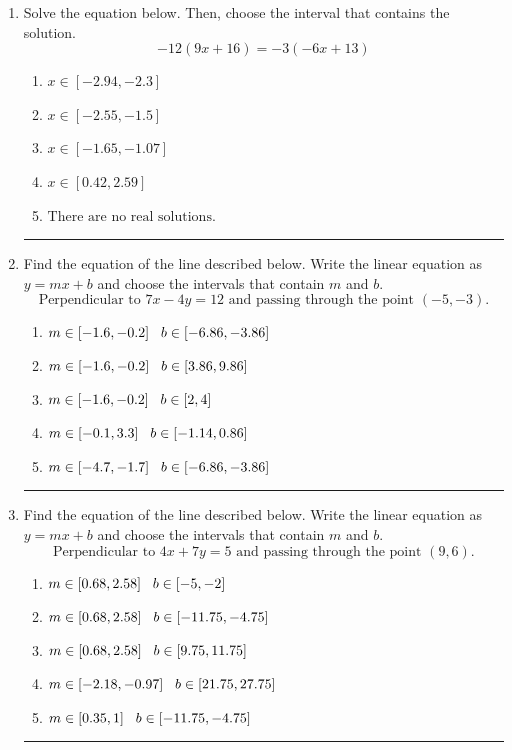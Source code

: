 \documentclass[14pt]{extbook}
\newcommand{\litem}[1]{\item#1\hspace*{-1cm}\rule{\textwidth}{0.4pt}}
\begin{document}
\begin{enumerate}
{\begin{enumerate}[label=\Alph*.]
\end{enumerate} }
\litem{
Solve the equation below. Then, choose the interval that contains the solution.\[ -12(9x + 16) = -3(-6x + 13) \]\begin{enumerate}[label=\Alph*.]
\item \( x \in [-2.94, -2.3] \)
\item \( x \in [-2.55, -1.5] \)
\item \( x \in [-1.65, -1.07] \)
\item \( x \in [0.42, 2.59] \)
\item \( \text{There are no real solutions.} \)

\end{enumerate} }
\litem{
Find the equation of the line described below. Write the linear equation as $ y=mx+b $ and choose the intervals that contain $m$ and $b$.\[ \text{Perpendicular to } 7 x - 4 y = 12 \text{ and passing through the point } (-5, -3). \]\begin{enumerate}[label=\Alph*.]
\item \( m \in [-1.6, -0.2] \hspace*{3mm} b \in [-6.86, -3.86] \)
\item \( m \in [-1.6, -0.2] \hspace*{3mm} b \in [3.86, 9.86] \)
\item \( m \in [-1.6, -0.2] \hspace*{3mm} b \in [2, 4] \)
\item \( m \in [-0.1, 3.3] \hspace*{3mm} b \in [-1.14, 0.86] \)
\item \( m \in [-4.7, -1.7] \hspace*{3mm} b \in [-6.86, -3.86] \)

\end{enumerate} }
\litem{
Find the equation of the line described below. Write the linear equation as $ y=mx+b $ and choose the intervals that contain $m$ and $b$.\[ \text{Perpendicular to } 4 x + 7 y = 5 \text{ and passing through the point } (9, 6). \]\begin{enumerate}[label=\Alph*.]
\item \( m \in [0.68, 2.58] \hspace*{3mm} b \in [-5, -2] \)
\item \( m \in [0.68, 2.58] \hspace*{3mm} b \in [-11.75, -4.75] \)
\item \( m \in [0.68, 2.58] \hspace*{3mm} b \in [9.75, 11.75] \)
\item \( m \in [-2.18, -0.97] \hspace*{3mm} b \in [21.75, 27.75] \)
\item \( m \in [0.35, 1] \hspace*{3mm} b \in [-11.75, -4.75] \)


\end{enumerate}}
\end{enumerate}
\end{document}

